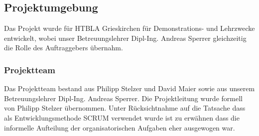\subsection{Projektumgebung}
Das Projekt wurde für HTBLA Grieskirchen für Demonstrations- und Lehrzwecke entwickelt, wobei unser Betreuungslehrer Dipl-Ing. Andreas Sperrer gleichzeitig die Rolle des Auftraggebers übernahm. 

\subsubsection{Projektteam}
Das Projektteam bestand aus Philipp Stelzer und David Maier sowie aus unserem Betreuungslehrer Dipl-Ing. Andreas Sperrer. Die Projektleitung wurde formell von Philipp Stelzer übernommen. Unter Rücksichtnahme auf die Tatsache dass als Entwicklungsmethode SCRUM verwendet wurde ist zu erwähnen dass die informelle Aufteilung der organisatorischen Aufgaben eher ausgewogen war.

